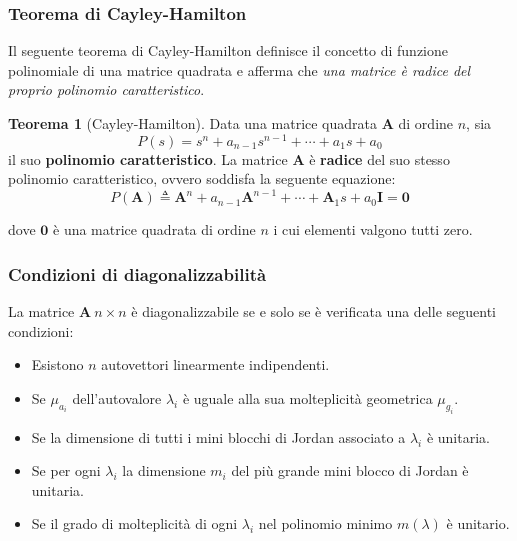 \documentclass[a4paper]{article}
\renewcommand{\vec}{\bm}
\theoremstyle{definition}
\newtheorem{thm}{Teorema}
\begin{document}
 			\subsubsection{Teorema di Cayley-Hamilton}
	 			Il seguente teorema di Cayley-Hamilton definisce il concetto di funzione polinomiale di una matrice quadrata e afferma che \textit{una matrice è radice del proprio polinomio caratteristico}.
	 			
	 			\begin{thm}[Cayley-Hamilton]
					Data una matrice quadrata $ \vec{A} $ di ordine $ n $, sia
					\[
						P(s) = s^n + a_{n-1}s^{n-1} + \cdots + a_1 s + a_0
					\]
					il suo \textbf{polinomio caratteristico}. La matrice $ \vec{A} $ è \textbf{radice} del suo stesso polinomio caratteristico, ovvero soddisfa la seguente equazione:
					\[
						P(\vec{A}) \triangleq \vec{A}^n + a_{n-1} \vec{A}^{n-1} + \cdots + \vec{A}_1 s + a_0\vec{I} = \vec{0}
					\]
	 			\end{thm}
	 			
	 			dove $ \vec{0} $ è una matrice quadrata di ordine $ n $ i cui elementi valgono tutti zero.
 			
 			\subsubsection{Condizioni di diagonalizzabilità}
	 			La matrice $ \vec{A}\ n\times n $ è diagonalizzabile se e solo se è verificata una delle seguenti condizioni:
	 			\begin{itemize}
	 				\item Esistono $ n $ autovettori linearmente indipendenti.
	 				\item Se $ \mu_{a_i} $ dell'autovalore $ \lambda_i $ è uguale alla sua molteplicità geometrica $ \mu_{g_i} $.
	 				\item Se la dimensione di tutti i mini blocchi di Jordan associato a $ \lambda_i $ è unitaria.
	 				\item Se per ogni $ \lambda_i $ la dimensione $ m_i $ del più grande mini blocco di Jordan è unitaria.
	 				\item Se il grado di molteplicità di ogni $ \lambda_i $ nel polinomio minimo $ m(\lambda) $ è unitario.
	 			\end{itemize}
	 			
	 		
			
			
\end{document}
